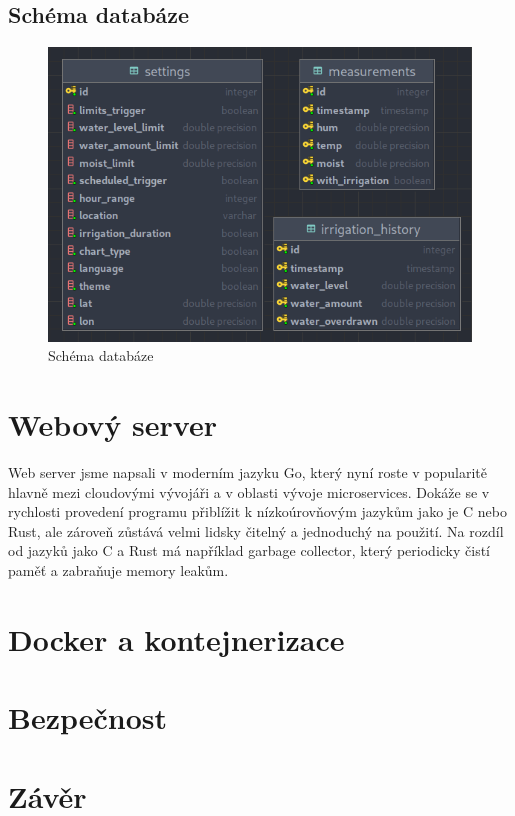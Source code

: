 \documentclass[12pt,a4paper]{article}
\begin{document}
\subsection{Schéma databáze}

\begin{figure}[h]
	\centering
	\includegraphics[width=0.9\linewidth]{db.png}
	\caption{Schéma databáze}
\end{figure}

\section{Webový server}

Web server jsme napsali v moderním jazyku Go, který nyní roste v popularitě hlavně mezi cloudovými vývojáři a v oblasti vývoje microservices. Dokáže se v rychlosti provedení programu přiblížit k nízkoúrovňovým jazykům jako je C nebo Rust, ale zároveň zůstává velmi lidsky čitelný a jednoduchý na použití. Na rozdíl od jazyků jako C a Rust má například garbage collector, který periodicky čistí paměť a zabraňuje memory leakům.

\section{Docker a kontejnerizace}

\section{Bezpečnost}

\clearpage

\section{Závěr}
\end{document}
